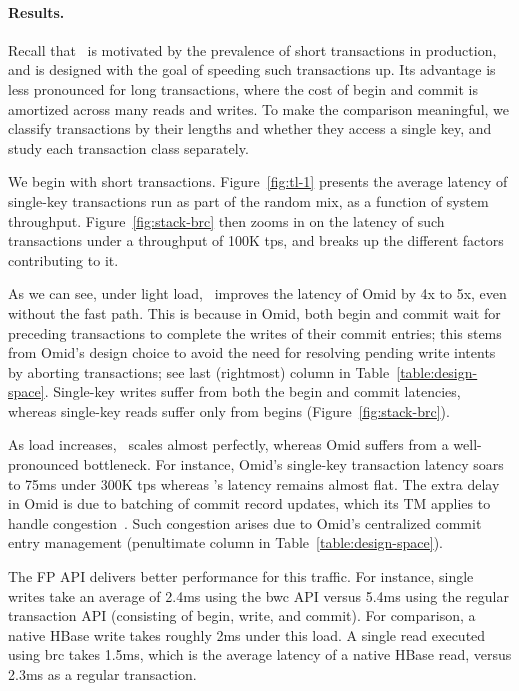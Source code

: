 \paragraph{Results.} 

Recall that \sys\ is motivated by the prevalence of short transactions in production, and is designed with
the goal of speeding such transactions up.
Its advantage is less pronounced for long transactions, where the cost of begin and commit is amortized
across many reads and writes.
To make the comparison meaningful, we classify transactions by their lengths and whether they
access a single key, and study each transaction class separately. 

We begin with short transactions. 
Figure~\ref{fig:tl-1} presents the average latency of single-key transactions run as part of the random mix,
as a function of {system} throughput.
Figure~\ref{fig:stack-brc}  then zooms in on the latency of such transactions under 
a throughput of 100K tps, and breaks up the different factors contributing to it. 

As we can see, under light load, \sys\ improves the latency of Omid by 4x to 5x, even without the fast path.
This is because in Omid, both begin and commit wait for preceding transactions to complete the writes of 
their commit entries; this stems from Omid's design choice to avoid the need for resolving pending write intents
by aborting transactions; see last (rightmost) column in Table~\ref{table:design-space}. 
Single-key writes suffer from both the begin and commit latencies, whereas single-key reads  
suffer only from begins (Figure~\ref{fig:stack-brc}). 

As load increases, \sys\ scales almost perfectly, whereas Omid suffers from a well-pronounced 
bottleneck. For instance, Omid's single-key transaction latency soars to 75ms under 300K tps whereas
{\sys}'s latency remains almost flat. The extra delay in Omid is due to batching of commit record updates, 
which its TM applies to handle congestion~\cite{Omid2017}. Such congestion arises due to Omid's centralized 
commit entry management (penultimate column in Table~\ref{table:design-space}).

The FP API delivers better performance for this traffic. For instance, single writes take an average of 2.4ms using 
the {\code bwc} API versus 5.4ms using the regular transaction API (consisting of begin, write, and commit). 
For comparison, a native HBase write takes roughly 2ms under this load.
A single read executed using {\code brc} takes 1.5ms, which is the average latency of a native HBase read,
versus 2.3ms as a regular transaction. 

